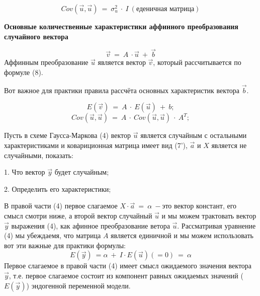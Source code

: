 \documentclass[12pt,a4paper]{article}
\begin{document}
\begin{equation*}
Cov\left(\vec{u} ,\vec{u}\right) \ =\ \sigma ^{2}_{u} \ \cdot \ I\ \left(\text{еденичная матрица}\right)
\end{equation*}
\begin{center}

\textbf{Основные количественные характеристики аффинного преобразования случайного вектора}
\end{center}

\begin{equation*}
\vec{v} \ =\ A\ \cdot \vec{u} \ +\ \vec{b}
\end{equation*}
Аффинным преобразование $\displaystyle \vec{u}$ является вектор $\displaystyle \vec{v}$, который рассчитывается по формуле (8).

Вот важное для практики правила рассчёта основных характеристик вектора $\displaystyle \vec{b} .$


\begin{equation*}
E\left(\vec{v}\right) \ =\ A\ \cdot \ E\left(\vec{u}\right) \ +\ b;
\end{equation*}
\begin{equation*}
Cov\left(\vec{u} ,\vec{u}\right) \ =\ A\ \cdot \ Cov\left(\vec{u} ,\vec{u}\right) \ \cdot \ A^{T} ;
\end{equation*}


Пусть в схеме Гаусса-Маркова (4) вектор $\displaystyle \vec{u}$ является случайным с остальными характеристиками и ковариционная матрица имеет вид (7'), $\displaystyle \vec{a}$ и $\displaystyle X$ является не случайными, показать:

	1. Что вектор $\displaystyle \vec{y}$ будет случайным;

	2. Определить его характеристики;

В правой части (4) первое слагаемое $\displaystyle X\cdot \vec{a} \ =\ \alpha \ -$это вектор констант, его смысл смотри ниже, а второй вектор случайный $\displaystyle \vec{u}$ и мы можем трактовать вектор $\displaystyle \vec{y}$ выражения (4), как афинное преобразование ветора $\displaystyle \vec{u}$. Рассматривая уравнение (4) мы убеждаемя, что матрица $\displaystyle A$ является единичной и мы можем использовать вот эти важные для практики формулы:
\begin{equation*}
E\left(\vec{y}\right) \ =\alpha \ +\ I\cdot E\left(\vec{u}\right)( =0) \ =\ \alpha
\end{equation*}
Первое слагаемое в правой части (4) имеет смысл ожидаемого значения вектора $\displaystyle \vec{y}$, т.е. первое слагаемое состоит из компонент равных ожидаемых значений ($\displaystyle E\left(\vec{y}\right)$) эндогенной переменной модели.
\end{document}
